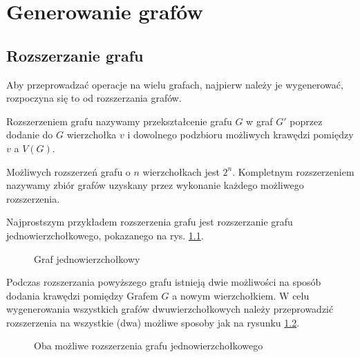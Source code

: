 \chapter{Generowanie grafów}

\section{Rozszerzanie grafu}
Aby przeprowadzać operacje na wielu grafach, najpierw należy je wygenerować, rozpoczyna się to od rozszerzania grafów. 
\begin{definition} Rozszerzeniem grafu nazywamy przekształcenie grafu $G$ w graf $G'$ poprzez dodanie do $G$ wierzchołka $v$ i dowolnego podzbioru możliwych krawędzi pomiędzy $v$ a $V(G)$.
\end{definition}
Możliwych rozszerzeń grafu o $n$ wierzchołkach jest $2^n$. Kompletnym rozszerzeniem nazywamy zbiór grafów uzyskany przez wykonanie każdego możliwego rozszerzenia.

Najprostszym przykładem rozszerzenia grafu jest rozszerzanie grafu jednowierzchołkowego, pokazanego na rys. \ref{grafjednowierzcholkowy}.
\begin{figure}[H]
  \centering
   \caption{Graf jednowierzchołkowy}
   \label{grafjednowierzcholkowy}
\end{figure}


Podczas rozszerzania powyższego grafu istnieją dwie możliwości na sposób dodania krawędzi pomiędzy Grafem $G$ a nowym wierzchołkiem. W celu wygenerowania wszystkich grafów dwuwierzchołkowych należy przeprowadzić rozszerzenia na wszystkie (dwa) możliwe sposoby jak na rysunku \ref{rozszerzeniedwuwierzcholkowe}.
\begin{figure}[h]
  
  \hfill
  \centering
   \hfill
   \centering
	\hfill
	\hfill
   \caption{Oba możliwe rozszerzenia grafu jednowierzchołkowego}
   \label{rozszerzeniedwuwierzcholkowe}
\end{figure}

